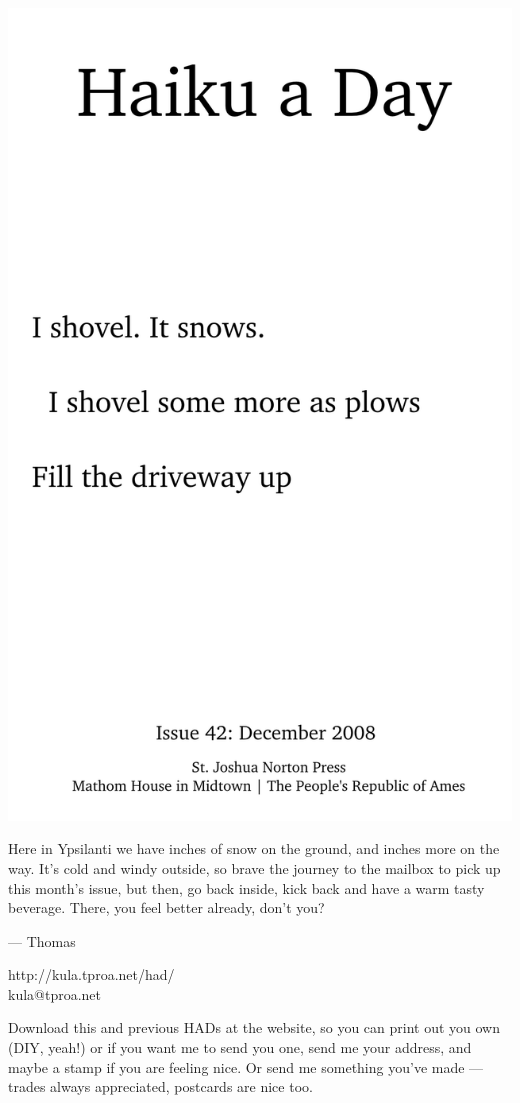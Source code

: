 \documentclass[12pt]{article}
\begin{document}
\includegraphics{frontpage.png}

\newpage

Here in Ypsilanti we have inches of snow on the ground, and
inches more on the way. It's cold and windy outside, so brave
the journey to the mailbox to pick up this month's issue, but
then, go back inside, kick back and have a warm tasty beverage.
There, you feel better already, don't you?

--- Thomas

http://kula.tproa.net/had/ \\
kula@tproa.net

Download this and previous HADs at the website, so you can
print out you own (DIY, yeah!) or if you want me to send
you one, send me your address, and maybe a stamp if you
are feeling nice. Or send me something you've made ---
trades always appreciated, postcards are nice too.
\end{document}
